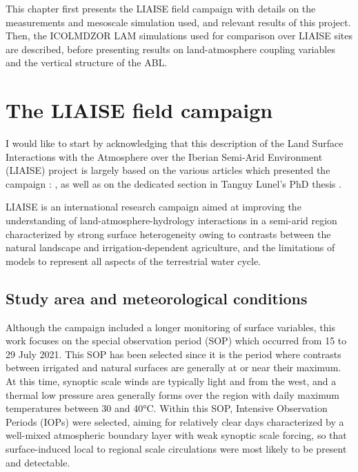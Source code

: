 This chapter first presents the LIAISE field campaign with details on the measurements and mesoscale simulation used, and relevant results of this project.
Then, the ICOLMDZOR LAM simulations used for comparison over LIAISE sites are described, before presenting results on land-atmosphere coupling variables and the vertical structure of the ABL.

\clearpage

\section{The LIAISE field campaign}
I would like to start by acknowledging that this description of the Land Surface Interactions with the Atmosphere over the Iberian Semi-Arid Environment (LIAISE) project is largely based on the various articles which presented the campaign : \citet{boone_land_2019,boone_updates_2021,boone_land_2025}, as well as on the dedicated section in Tanguy Lunel's PhD thesis \citep{lunel_interactions_2024}.

LIAISE is an international research campaign aimed at improving the understanding of land-atmosphere-hydrology interactions in a semi-arid region characterized by strong surface heterogeneity owing to contrasts between the natural landscape and irrigation-dependent agriculture, and the limitations of models to represent all aspects of the terrestrial water cycle.

\subsection{Study area and meteorological conditions}

Although the campaign included a longer monitoring of surface variables, this work focuses on the special observation period (SOP) which occurred from 15 to 29 July 2021. This SOP has been selected since it is the period where contrasts between irrigated and natural surfaces are generally at or near their maximum. At this time, synoptic scale winds are typically light and from the west, and a  thermal low pressure area generally forms over the region with daily maximum temperatures between 30 and 40°C.
Within this SOP, Intensive Observation Periods (IOPs) were selected, aiming for relatively clear days characterized by a well-mixed  atmospheric boundary layer with weak synoptic scale forcing, so that surface-induced local to regional scale circulations were most likely to be present and detectable. 

